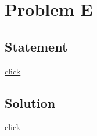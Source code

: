 \section{Problem E}
    \subsection{Statement}
        {\color{blue} \href{http://hsin.hr/coci/archive/2006_2007/contest2_tasks.pdf}{click}}

    \subsection{Solution}
        {\color{blue} \href{http://hsin.hr/coci/archive/2006_2007/contest2_solutions.zip}{click}}
